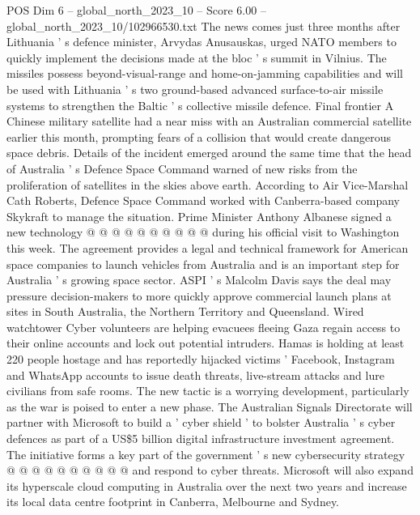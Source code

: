 \begin{textsample}{POS Dim 6 – global\_north\_2023\_10 – Score 6.00 – global\_north\_2023\_10/102966530.txt}
The news comes just three months after Lithuania ' s defence minister, Arvydas Anusauskas, urged NATO members to quickly implement the decisions made at the bloc ' s summit in Vilnius.
The missiles possess beyond-visual-range and home-on-jamming capabilities and will be used with Lithuania ' s two ground-based advanced surface-to-air missile systems to strengthen the Baltic ' s collective missile defence.
Final frontier A Chinese military satellite had a near miss with an Australian commercial satellite earlier this month, prompting fears of a collision that would create dangerous space debris.
Details of the incident emerged around the same time that the head of Australia ' s Defence Space Command warned of new risks from the proliferation of satellites in the skies above earth.
According to Air Vice-Marshal Cath Roberts, Defence Space Command worked with Canberra-based company Skykraft to manage the situation.
Prime Minister Anthony Albanese signed a new technology @ @ @ @ @ @ @ @ @ @ during his official visit to Washington this week.
The agreement provides a legal and technical framework for American space companies to launch vehicles from Australia and is an important step for Australia ' s growing space sector.
ASPI ' s Malcolm Davis says the deal may pressure decision-makers to more quickly approve commercial launch plans at sites in South Australia, the Northern Territory and Queensland.
Wired watchtower Cyber volunteers are helping evacuees fleeing Gaza regain access to their online accounts and lock out potential intruders.
Hamas is holding at least 220 people hostage and has reportedly hijacked victims ' Facebook, Instagram and WhatsApp accounts to issue death threats, live-stream attacks and lure civilians from safe rooms.
The new tactic is a worrying development, particularly as the war is poised to enter a new phase.
The Australian Signals Directorate will partner with Microsoft to build a ' cyber shield ' to bolster Australia ' s cyber defences as part of a US\$5 billion digital infrastructure investment agreement.
The initiative forms a key part of the government ' s new cybersecurity strategy @ @ @ @ @ @ @ @ @ @ and respond to cyber threats.
Microsoft will also expand its hyperscale cloud computing in Australia over the next two years and increase its local data centre footprint in Canberra, Melbourne and Sydney.

\end{textsample}
